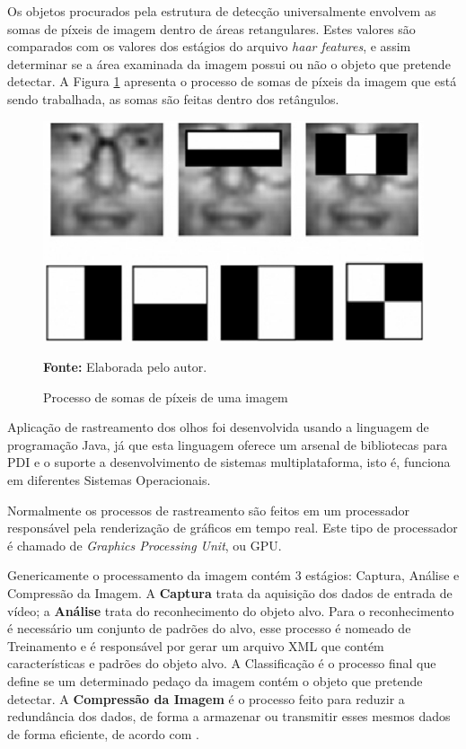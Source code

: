 Os objetos procurados pela estrutura de detecção universalmente envolvem as somas de píxeis de imagem dentro de áreas retangulares. Estes valores são comparados com os valores dos estágios do arquivo \textit{haar features}, e assim determinar se a área examinada da imagem possui ou não o objeto que pretende detectar. A Figura \ref{fig:viola-jones-ret} apresenta o processo de somas de píxeis da imagem que está sendo trabalhada, as somas são feitas dentro dos retângulos. 

\begin{figure}[H]
\caption{Processo de somas de píxeis de uma imagem} 
\centering \includegraphics[scale=0.6]{img/viola-jones-ret.png}

{\fontsize{11}{11}\selectfont \textbf{Fonte:} Elaborada pelo autor.}
\label{fig:viola-jones-ret}
\end{figure}

Aplicação de rastreamento dos olhos foi desenvolvida usando a linguagem de programação Java, já que esta linguagem oferece um arsenal de bibliotecas para PDI e o suporte a desenvolvimento de sistemas multiplataforma, isto é, funciona em diferentes Sistemas Operacionais. 

Normalmente os processos de rastreamento são feitos em um processador responsável pela renderização de gráficos em tempo real. Este tipo de processador é chamado de \textit{Graphics Processing Unit}, ou GPU.

Genericamente o processamento da imagem contém 3 estágios: Captura, Análise e Compressão da Imagem. A \textbf{Captura} trata da aquisição dos dados de entrada de vídeo; a \textbf{Análise} trata do reconhecimento do objeto alvo. Para o reconhecimento é necessário um conjunto de padrões do alvo, esse processo é nomeado de Treinamento e é responsável por gerar um arquivo XML que contém características e padrões do objeto alvo. A Classificação é o processo final que define se um determinado pedaço da imagem contém o objeto que pretende detectar. A \textbf{Compressão da Imagem} é o processo feito para reduzir a redundância dos dados, de forma a armazenar ou transmitir esses mesmos dados de forma eficiente, de acordo com .

